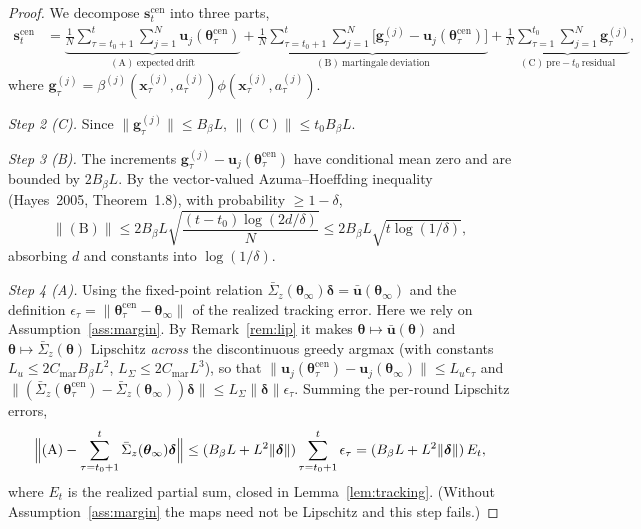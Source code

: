 \documentclass[11pt]{article}
\begin{document}
\begin{proof}
We decompose $\bm{s}_t^{\mathrm{cen}}$ into three parts,
\begin{align*}
\bm{s}_t^{\mathrm{cen}}&=
\underbrace{\frac{1}{N}\sum_{\tau=t_0+1}^t\sum_{j=1}^N
\bm{u}_j(\bm{\theta}_\tau^{\mathrm{cen}})}_{\mathrm{(A)\ expected\ drift}}
+\underbrace{\frac{1}{N}\sum_{\tau=t_0+1}^t\sum_{j=1}^N
\bigl[\bm{g}_\tau^{(j)}-\bm{u}_j(\bm{\theta}_\tau^{\mathrm{cen}})\bigr]}_{\mathrm{(B)\ martingale\ deviation}}
+\underbrace{\frac{1}{N}\sum_{\tau=1}^{t_0}\sum_{j=1}^N
\bm{g}_\tau^{(j)}}_{\mathrm{(C)\ pre-}t_0\mathrm{\ residual}},
\end{align*}
where $\bm{g}_\tau^{(j)}=\beta^{(j)}(\bm{x}_\tau^{(j)},a_\tau^{(j)})
\phi(\bm{x}_\tau^{(j)},a_\tau^{(j)})$.

\textit{Step 2 (C).}  Since $\|\bm{g}_\tau^{(j)}\|\leq B_\beta L$,
$\|(\mathrm{C})\|\leq t_0 B_\beta L$.

\textit{Step 3 (B).}  The increments
$\bm{g}_\tau^{(j)}-\bm{u}_j(\bm{\theta}_\tau^{\mathrm{cen}})$
have conditional mean zero and are bounded by $2B_\beta L$.
By the vector-valued Azuma--Hoeffding inequality (Hayes~2005,
Theorem~1.8), with probability $\geq 1-\delta$,
\[
\|(\mathrm{B})\|\leq 2B_\beta L\sqrt{\frac{(t-t_0)\log(2d/\delta)}{N}}
\leq 2B_\beta L\sqrt{t\log(1/\delta)},
\]
absorbing $d$ and constants into $\log(1/\delta)$.

\textit{Step 4 (A).}  Using the fixed-point relation
$\bar{\Sigma}_z(\bm{\theta}_\infty)\bm{\delta}=\bar{\bm{u}}(\bm{\theta}_\infty)$
and the definition
$\epsilon_\tau=\|\bm{\theta}_\tau^{\mathrm{cen}}-\bm{\theta}_\infty\|$ of
the realized tracking error.
Here we rely on Assumption~\ref{ass:margin}. By
Remark~\ref{rem:lip} it makes
$\bm{\theta}\mapsto\bar{\bm{u}}(\bm{\theta})$ and
$\bm{\theta}\mapsto\bar{\Sigma}_z(\bm{\theta})$ Lipschitz \emph{across}
the discontinuous greedy argmax (with constants
$L_u\leq 2C_{\mathrm{mar}}B_\beta L^2$,
$L_\Sigma\leq 2C_{\mathrm{mar}}L^3$), so that
$\|\bm{u}_j(\bm{\theta}_\tau^{\mathrm{cen}})-\bm{u}_j(\bm{\theta}_\infty)\|
\leq L_u\epsilon_\tau$ and
$\|(\bar{\Sigma}_z(\bm{\theta}_\tau^{\mathrm{cen}})
-\bar{\Sigma}_z(\bm{\theta}_\infty))\bm{\delta}\|\leq L_\Sigma\|\bm{\delta}\|\epsilon_\tau$.
Summing the per-round Lipschitz errors,
\[
\Bigl\|(\mathrm{A})-\sum_{\tau=t_0+1}^t\bar{\Sigma}_z(\bm{\theta}_\infty)\bm{\delta}\Bigr\|
\leq (B_\beta L+L^2\|\bm{\delta}\|)\sum_{\tau=t_0+1}^t\epsilon_\tau
=(B_\beta L+L^2\|\bm{\delta}\|)\,E_t,
\]
where $E_t$ is the realized partial sum, closed in
Lemma~\ref{lem:tracking}.  (Without
Assumption~\ref{ass:margin} the maps need not be Lipschitz and this
step fails.)


\end{proof}
\end{document}
